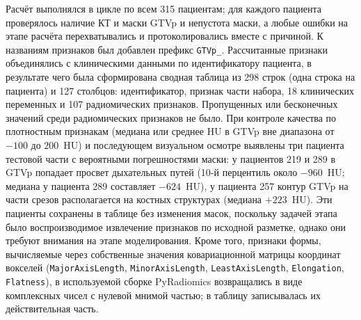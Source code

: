 \documentclass[11pt,a4paper]{article}
\newcommand{\Ntotal}{315}
\newcommand{\Nok}{298}
\newcommand{\Nfeat}{107}
\begin{document}
Расчёт выполнялся в цикле по всем \Ntotal{} пациентам; для каждого пациента проверялось наличие КТ и маски GTVp и непустота маски, а любые ошибки на этапе расчёта перехватывались и протоколировались вместе с причиной. К названиям признаков был добавлен префикс \texttt{GTVp\_}. Рассчитанные признаки объединялись с клиническими данными по идентификатору пациента, в результате чего была сформирована сводная таблица из \Nok{} строк (одна строка на пациента) и 127 столбцов: идентификатор, признак части набора, 18 клинических переменных и \Nfeat{} радиомических признаков. Пропущенных или бесконечных значений среди радиомических признаков не было. При контроле качества по плотностным признакам (медиана или среднее HU в GTVp вне диапазона от $-100$ до $200$~HU) и последующем визуальном осмотре выявлены три пациента тестовой части с вероятными погрешностями маски: у пациентов 219 и 289 в GTVp попадает просвет дыхательных путей (10-й перцентиль около $-960$~HU; медиана у пациента 289 составляет $-624$~HU), у пациента 257 контур GTVp на части срезов располагается на костных структурах (медиана $+223$~HU). Эти пациенты сохранены в таблице без изменения масок, поскольку задачей этапа было воспроизводимое извлечение признаков по исходной разметке, однако они требуют внимания на этапе моделирования. Кроме того, признаки формы, вычисляемые через собственные значения ковариационной матрицы координат вокселей (\texttt{MajorAxisLength}, \texttt{MinorAxisLength}, \texttt{LeastAxisLength}, \texttt{Elongation}, \texttt{Flatness}), в используемой сборке PyRadiomics возвращались в виде комплексных чисел с нулевой мнимой частью; в таблицу записывалась их действительная часть.
\end{document}
